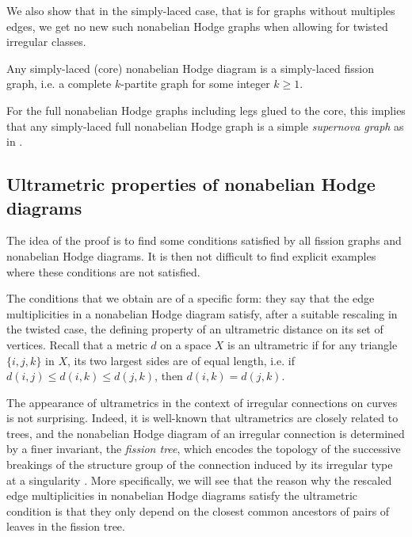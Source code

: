 \documentclass[11pt,a4paper]{amsart}
\numberwithin{equation}{section}
\begin{document}
We also show that in the simply-laced case, that is for graphs without multiples edges, we get no new such nonabelian Hodge graphs when allowing for twisted irregular classes. 

\begin{theorem}
Any simply-laced (core) nonabelian Hodge diagram is a simply-laced fission graph, i.e. a complete $k$-partite graph for some integer $k\geq 1$. 
\end{theorem}

For the full nonabelian Hodge graphs including legs glued to the core, this implies that any simply-laced full nonabelian Hodge graph is a simple \emph{supernova graph} as in \cite{boalch2008irregular, boalch2012simply}.




\subsection{Ultrametric properties of nonabelian Hodge diagrams}

The idea of the proof is to find some conditions satisfied by all fission graphs and nonabelian Hodge diagrams. It is then not difficult to find explicit examples where these conditions are not satisfied.

The conditions that we obtain are of a specific form: they say that the edge multiplicities in a nonabelian Hodge diagram satisfy, after a suitable rescaling in the twisted case, the defining property of an ultrametric distance on its set of vertices. Recall that a metric $d$ on a space $X$ is an ultrametric if for any triangle $\{i,j,k\}$ in $X$, its two largest sides are of equal length, i.e. if $d(i,j)\leq d(i,k)\leq d(j,k)$, then $d(i,k)=d(j,k)$.

The appearance of ultrametrics in the context of irregular connections on curves is not surprising. Indeed, it is well-known that ultrametrics are closely related to trees, and the nonabelian Hodge diagram of an irregular connection is determined by a finer invariant, the \emph{fission tree}, which encodes the topology of the successive breakings of the structure group of the connection induced by its irregular type at a singularity \cite{boalch2025twisted}. More specifically, we will see that the reason why the rescaled edge multiplicities in nonabelian Hodge diagrams satisfy the ultrametric condition is that they only depend on the closest common ancestors of pairs of leaves in the fission tree.
 
\end{document}
